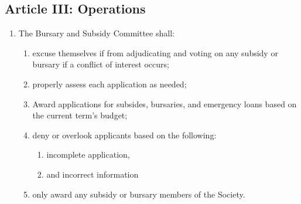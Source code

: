 \subsection{Article III: Operations}
\begin{enumerate}[label*=\arabic*., align=left]	
\item The Bursary and Subsidy Committee shall:
\begin{enumerate}[label*=\arabic*., align=left]	
\item excuse themselves if from adjudicating and voting on any subsidy or bursary if a conflict of interest occurs;
\item properly assess each application as needed;
\item Award applications for subsides, bursaries, and emergency loans based on the current term’s budget;
\item deny or overlook applicants based on the following:
\begin{enumerate}[label*=\arabic*., align=left]
\item incomplete application,
\item and incorrect information
\end{enumerate}
\item only award any subsidy or bursary members of the Society.
\end{enumerate}
\end{enumerate}

